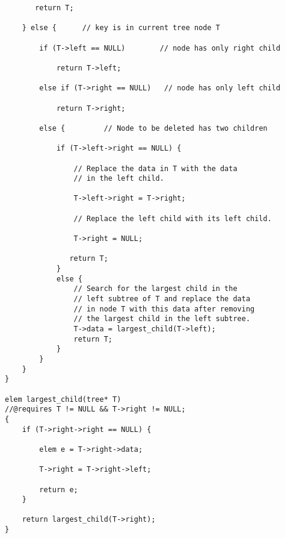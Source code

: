 \documentclass[12pt]{exam}
\begin{document}
\begin{questions}
\begin{parts}
\begin{solution}
\begin{verbatim}
       return T;

    } else {      // key is in current tree node T

        if (T->left == NULL)        // node has only right child

            return T->left;

        else if (T->right == NULL)   // node has only left child

            return T->right;

        else {         // Node to be deleted has two children

            if (T->left->right == NULL) {

                // Replace the data in T with the data
                // in the left child.

                T->left->right = T->right;

                // Replace the left child with its left child.

                T->right = NULL;

               return T;
            }
            else {
                // Search for the largest child in the
                // left subtree of T and replace the data
                // in node T with this data after removing
                // the largest child in the left subtree.
                T->data = largest_child(T->left);
                return T;
            }
        }
    }
}

elem largest_child(tree* T)
//@requires T != NULL && T->right != NULL;
{
    if (T->right->right == NULL) {

        elem e = T->right->data;

        T->right = T->right->left;

        return e;
    }

    return largest_child(T->right);
}
\end{verbatim}
\end{solution}



\end{parts}



\end{questions}
\end{document}
